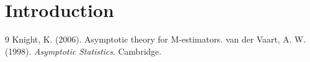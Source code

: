 \documentclass{article}
\begin{document}
\section{Introduction}




\appendix



\begin{thebibliography}{9}
 Knight, K. (2006). Asymptotic theory for M-estimators.
 van der Vaart, A. W. (1998). \emph{Asymptotic Statistics}. Cambridge.
\end{thebibliography}
\end{document}
